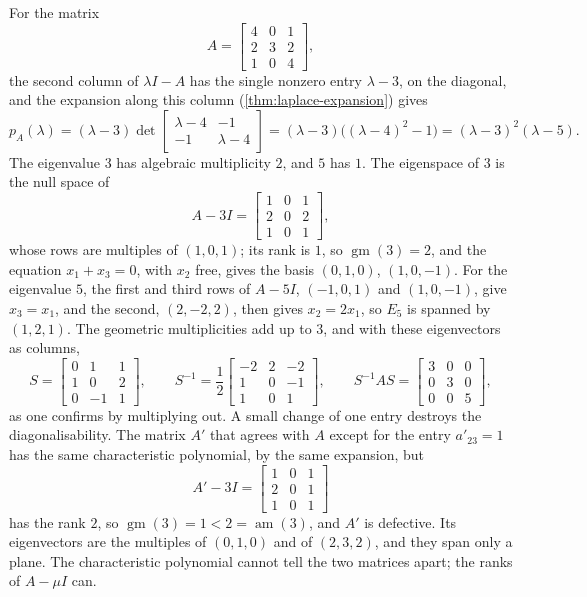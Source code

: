 For the matrix
\[
A=\begin{bmatrix}4&0&1\\2&3&2\\1&0&4\end{bmatrix},
\]
the second column of $\lambda I-A$ has the single nonzero entry $\lambda-3$, on the diagonal, and the expansion along this column (\cref{thm:laplace-expansion}) gives
\[
p_A(\lambda)=(\lambda-3)\det\begin{bmatrix}\lambda-4&-1\\-1&\lambda-4\end{bmatrix}=(\lambda-3)\bigl((\lambda-4)^2-1\bigr)=(\lambda-3)^2(\lambda-5).
\]
The eigenvalue $3$ has algebraic multiplicity $2$, and $5$ has $1$. The eigenspace of $3$ is the null space of
\[
A-3I=\begin{bmatrix}1&0&1\\2&0&2\\1&0&1\end{bmatrix},
\]
whose rows are multiples of $(1,0,1)$; its rank is $1$, so $\operatorname{gm}(3)=2$, and the equation $x_1+x_3=0$, with $x_2$ free, gives the basis $(0,1,0)$, $(1,0,-1)$. For the eigenvalue $5$, the first and third rows of $A-5I$, $(-1,0,1)$ and $(1,0,-1)$, give $x_3=x_1$, and the second, $(2,-2,2)$, then gives $x_2=2x_1$, so $E_5$ is spanned by $(1,2,1)$. The geometric multiplicities add up to $3$, and with these eigenvectors as columns,
\[
S=\begin{bmatrix}0&1&1\\1&0&2\\0&-1&1\end{bmatrix},\qquad S^{-1}=\frac12\begin{bmatrix}-2&2&-2\\1&0&-1\\1&0&1\end{bmatrix},\qquad S^{-1}AS=\begin{bmatrix}3&0&0\\0&3&0\\0&0&5\end{bmatrix},
\]
as one confirms by multiplying out. A small change of one entry destroys the diagonalisability. The matrix $A'$ that agrees with $A$ except for the entry $a'_{23}=1$ has the same characteristic polynomial, by the same expansion, but
\[
A'-3I=\begin{bmatrix}1&0&1\\2&0&1\\1&0&1\end{bmatrix}
\]
has the rank $2$, so $\operatorname{gm}(3)=1<2=\operatorname{am}(3)$, and $A'$ is defective. Its eigenvectors are the multiples of $(0,1,0)$ and of $(2,3,2)$, and they span only a plane. The characteristic polynomial cannot tell the two matrices apart; the ranks of $A-\mu I$ can.

